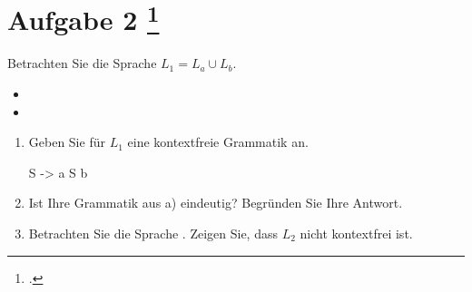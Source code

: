 \documentclass{lehramt-informatik-aufgabe}
\begin{document}
\let\m=\liMenge
{}
\section{Aufgabe 2
\footcite{66115:2017:09}}

Betrachten Sie die Sprache $L_1 = L_a \cup L_b$.

\begin{itemize}
\item[] 
\item[] 
\end{itemize}
\begin{enumerate}


\item Geben Sie für $L_1$ eine kontextfreie Grammatik an.
\begin{liAntwort}
\begin{liProduktionsRegeln}
S -> a S b
\end{liProduktionsRegeln}
\end{liAntwort}


\item Ist Ihre Grammatik aus a) eindeutig? Begründen Sie Ihre Antwort.


\item Betrachten Sie die Sprache . Zeigen Sie, dass $L_2$ nicht kontextfrei ist.
\end{enumerate}
\end{document}
